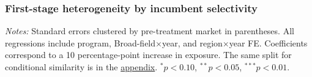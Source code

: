 \documentclass{beamer}
\begin{document}
\begin{frame}[label=sua-selectivity-heterogeneity]

\frametitle{First-stage heterogeneity by incumbent selectivity}

\centering

\begin{table}
\centering
\tiny
\setlength{\tabcolsep}{4.5pt}
\renewcommand{\arraystretch}{0.95}


\end{table}

\vspace{-0.05cm}


\parbox{0.95\textwidth}{
\tiny
\textit{Notes:}
Standard errors clustered by pre-treatment market in parentheses.
All regressions include program, Broad-field$\times$year, and region$\times$year FE.
Coefficients correspond to a 10 percentage-point increase in exposure.
The same split for conditional similarity is in the
\hyperlink{sua-q-heterogeneity}{\color{blue}appendix}.
$^{*}p<0.10$, $^{**}p<0.05$, $^{***}p<0.01$.
}

\end{frame}

\end{document}
